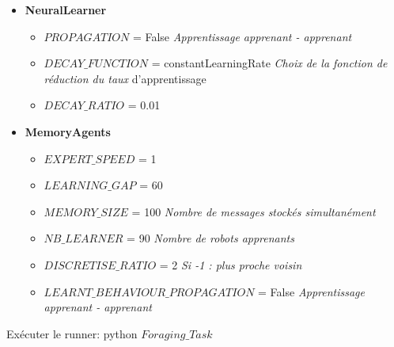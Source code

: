 \documentclass[a4paper, 12pt]{report}
\begin{document}
\begin{itemize}
\item{\textbf{NeuralLearner}}
	\begin{itemize}
		\item{$PROPAGATION$ = False					\textit{Apprentissage apprenant - apprenant}}
		\item{$DECAY\_FUNCTION$ = constantLearningRate	\textit{Choix de la fonction de réduction du taux} d'apprentissage}
		\item{$DECAY\_RATIO$ = 0.01}
	\end{itemize}

\item{\textbf{MemoryAgents}}
	\begin{itemize}
		\item{$EXPERT\_SPEED$ = 1}
		\item{$LEARNING\_GAP$ = 60}										
		\item{$MEMORY\_SIZE$ = 100					\textit{Nombre de messages stockés simultanément}}
		\item{$NB\_LEARNER$ = 90						\textit{Nombre de robots apprenants}}
		\item{$DISCRETISE\_RATIO$ = 2                \textit{Si -1 : plus proche voisin}}
		\item{$LEARNT\_BEHAVIOUR\_PROPAGATION$ = False \textit{Apprentissage apprenant - apprenant}}
	\end{itemize}
\end{itemize}
Exécuter le runner:
python $Foraging\_Task$
\end{document}
